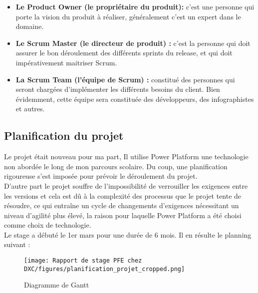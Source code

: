 \begin{itemize}
  \item \textbf{Le Product Owner (le propriétaire du produit):}
        c’est une personne qui porte la vision du produit à réaliser, généralement c’est un expert dans le domaine.
    \\
    \item \textbf{Le Scrum Master (le directeur de produit) :}
        c'est la personne qui doit assurer le bon déroulement des différents sprints du release, et qui doit impérativement maitriser Scrum.
    \\    
    \item \textbf{La Scrum Team (l’équipe de Scrum) :}
        constitué des personnes qui seront
        chargées d’implémenter les différents besoins du client. Bien
        évidemment, cette équipe sera constituée des développeurs, des
        infographistes et autres.
    \\    

\end{itemize}

\newpage
\subsection{Planification du projet}
Le projet était nouveau pour ma part, Il utilise Power Platform une technologie non abordée le long de mon parcours scolaire. Du coup, une planification rigoureuse s’est imposée pour prévoir le déroulement du projet.
\\[0.5cm]
D'autre part le projet souffre de l'impossibilité de verrouiller les exigences entre les versions et cela est dû à la complexité des processus que le projet tente de résoudre, ce qui entraîne un cycle de changements d'exigences nécessitant un niveau d'agilité plus élevé, la raison pour laquelle Power Platform a été choisi comme choix de technologie.
\\[0.5cm]
Le stage a débuté le 1er mars pour une durée de 6 mois. Il en résulte le planning
suivant :

\begin{figure}[H]
    \centering
    \texttt{[image: Rapport de stage PFE chez DXC/figures/planification\_projet\_cropped.png]}
    \caption{Diagramme de Gantt}
\end{figure}

